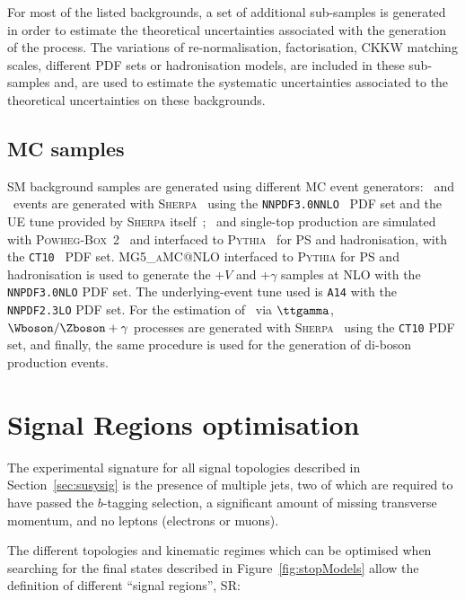 		\noindent For most of the listed backgrounds, a set of additional sub-samples is generated in order to estimate the theoretical uncertainties associated with the generation of the process. The variations of re-normalisation, factorisation, \ac{CKKW} matching scales, different \ac{PDF} sets or hadronisation models, are included in these sub-samples and, are used to estimate the systematic uncertainties associated to the theoretical uncertainties on these backgrounds.

		\subsection{MC samples}
		\label{subsec:mc_samples}

			\ac{SM} background samples are generated using different \ac{MC} event generators: \Zjets\ and \Wjets\ events are generated with \textsc{Sherpa}~\cite{Sherpa} using the \verb+NNPDF3.0NNLO+~\cite{PDFs} \ac{PDF} set and the \ac{UE} tune provided by \textsc{Sherpa} itself~\cite{Sherpa}; \ttbar\ and single-top production are simulated with \textsc{Powheg-Box}~2~\cite{powheg-box} and interfaced to \textsc{Pythia}~\cite{Pythia2006} for \ac{PS} and hadronisation, with the \verb+CT10+~\cite{CT10} \ac{PDF} set. {\scshape MG5\_aMC\/@NLO} interfaced to \textsc{Pythia} for \ac{PS} and hadronisation is used to generate the \ttbar+$V$ and \ttbar+$\gamma$ samples at \ac{NLO} with the \verb+NNPDF3.0NLO+ \ac{PDF} set. The underlying-event tune used is \verb+A14+ with the \verb+NNPDF2.3LO+ \ac{PDF} set. For the estimation of \ttZ\ via $\ttgamma$, $\Wboson/\Zboson+\gamma$ processes are generated with \textsc{Sherpa}~\cite{Sherpa} using the \verb+CT10+ \ac{PDF} set, and finally, the same procedure is used for the generation of di-boson production events.


	\section{Signal Regions optimisation}
	\label{sec:SRs}

		The experimental signature for all signal topologies described in Section~\ref{sec:susysig} is the presence of multiple jets, two of which are required to have passed the $b$-tagging selection, a significant amount of missing transverse momentum, and no leptons (electrons or muons).

		The different topologies and kinematic regimes which can be optimised when searching for the final states described in Figure~\ref{fig:stopModels} allow the definition of different ``signal regions'', \ac{SR}: 
		
